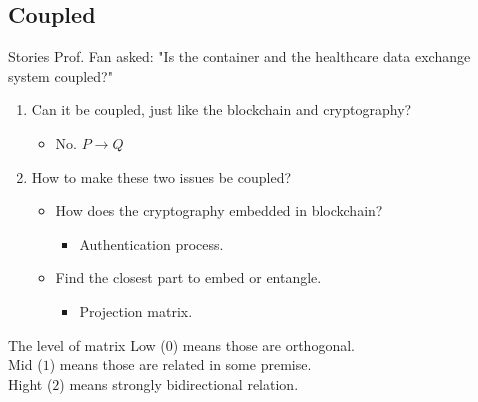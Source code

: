 \documentclass{beamer}
\begin{document}
\begin{CJK*}{UTF8}{bsmi}
  \section{Coupled}
  \begin{frame}{Stories}
    Prof. Fan asked: "Is the container and the healthcare data exchange system coupled?"\\
    \begin{enumerate}
      \item Can it be coupled, just like the blockchain and cryptography?
            \begin{itemize}
              \item No. $P \rightarrow Q$
            \end{itemize}
      \item How to make these two issues be coupled?
            \begin{itemize}
              \item How does the cryptography embedded in blockchain?
                    \begin{itemize}
                      \item Authentication process.
                    \end{itemize}
              \item Find the closest part to embed or entangle.
                    \begin{itemize}
                      \item Projection matrix.
                    \end{itemize}
            \end{itemize}
    \end{enumerate}
  \end{frame}


  \begin{frame}{The level of matrix}
    Low ($0$) means those are orthogonal.\\
    Mid ($1$) means those are related in some premise.\\
    Hight ($2$) means strongly bidirectional relation.\\
  \end{frame}


\end{CJK*}
\end{document}

